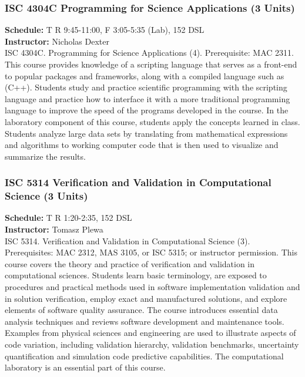 \documentclass[12pt,a4paper]{article}
\begin{document}
\subsubsection*{ISC 4304C Programming for Science Applications (3 Units)}
\textbf{Schedule:} T R 9:45-11:00, F 3:05-5:35 (Lab), 152 DSL \\
\textbf{Instructor:} Nicholas Dexter \\
ISC 4304C. Programming for Science Applications (4). Prerequisite: MAC 2311. This course provides knowledge of a scripting language that serves as a front-end to popular packages and frameworks, along with a compiled language such as (C++). Students study and practice scientific programming with the scripting language and practice how to interface it with a more traditional programming language to improve the speed of the programs developed in the course. In the laboratory component of this course, students apply the concepts learned in class. Students analyze large data sets by translating from mathematical expressions and algorithms to working computer code that is then used to visualize and summarize the results.

\subsubsection*{ISC 5314 Verification and Validation in Computational Science (3 Units)}
\textbf{Schedule:} T R 1:20-2:35, 152 DSL \\
\textbf{Instructor:} Tomasz Plewa \\
ISC 5314. Verification and Validation in Computational Science (3). Prerequisites: MAC 2312, MAS 3105, or ISC 5315; or instructor permission. This course covers the theory and practice of verification and validation in computational sciences. Students learn basic terminology, are exposed to procedures and practical methods used in software implementation validation and in solution verification, employ exact and manufactured solutions, and explore elements of software quality assurance. The course introduces essential data analysis techniques and reviews software development and maintenance tools. Examples from physical sciences and engineering are used to illustrate aspects of code variation, including validation hierarchy, validation benchmarks, uncertainty quantification and simulation code predictive capabilities. The computational laboratory is an essential part of this course.
\end{document}
